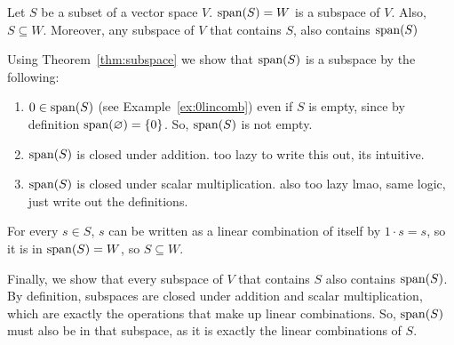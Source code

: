 \documentclass[12pt]{article}
\begin{document}
\begin{thm}
    Let $S$ be a subset of a vector space $V$. $\operatorname{span}(S) = W$ is a subspace of $V$. Also, $S \subseteq W$. Moreover, any subspace of $V$ that contains $S$, also contains $\operatorname{span}(S)$
\end{thm}
\begin{pf}
    Using Theorem~\ref{thm:subspace} we show that $\operatorname{span}(S)$ is a subspace by the following:
    \begin{enumerate}[label=(\roman*)]
        \item $0 \in \operatorname{span}(S)$ (see Example~\ref{ex:0lincomb}) even if $S$ is empty, since by definition $\operatorname{span}(\varnothing) = \{ 0 \}$. So, $\operatorname{span}(S)$ is not empty.
        \item $\operatorname{span}(S)$ is closed under addition. too lazy to write this out, its intuitive.
        \item $\operatorname{span}(S)$ is closed under scalar multiplication. also too lazy lmao, same logic, just write out the definitions.
    \end{enumerate}
    For every $s \in S$, $s$ can be written as a linear combination of itself by $1 \cdot s = s$, so it is in $\operatorname{span}(S) = W$, so $S \subseteq W$.

    Finally, we show that every subspace of $V$ that contains $S$ also contains $\operatorname{span}(S)$. By definition, subspaces are closed under addition and scalar multiplication, which are exactly the operations that make up linear combinations. So, $\operatorname{span}(S)$ must also be in that subspace, as it is exactly the linear combinations of $S$.
\end{pf}
\end{document}
